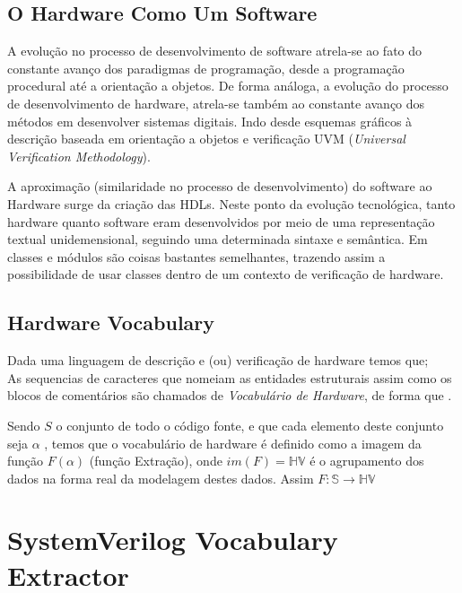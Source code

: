 \documentclass[12pt, twocolumn, a4paper]{article}
\begin{document}

	\subsection{O Hardware Como Um Software}
\quad A evolução no processo de desenvolvimento de software atrela-se ao fato do constante avanço dos paradigmas de programação, desde a programação procedural até a orientação a objetos. De forma análoga, a evolução do processo de desenvolvimento de hardware, atrela-se também ao constante avanço dos métodos em desenvolver sistemas digitais. Indo desde esquemas gráficos à descrição baseada em orientação a objetos e verificação UVM (\textit{Universal Verification Methodology}).

A aproximação (similaridade no processo de desenvolvimento) do software ao Hardware surge da criação das HDLs. Neste ponto da evolução tecnológica, tanto hardware quanto software eram desenvolvidos por meio de uma representação textual unidemensional, seguindo uma determinada sintaxe e semântica. Em \cite{Hahanov2008} classes e módulos são coisas bastantes semelhantes, trazendo assim a possibilidade de usar classes dentro de um contexto de verificação de hardware. 

	\subsection{Hardware Vocabulary} 
	
Dada uma linguagem de descrição e (ou) verificação de hardware temos que;\\
As sequencias de caracteres que nomeiam as entidades estruturais assim como os blocos de comentários são chamados de \textit{Vocabulário de Hardware}, de forma que .  

Sendo $S$ o conjunto de todo o código fonte, e que cada elemento deste conjunto seja $\alpha$ , temos que o vocabulário de hardware é definido como  a imagem da função $F(\alpha)$ (função Extração), onde $im(F) = \mathbb{HV}$ é o agrupamento dos dados na forma real da modelagem destes dados. Assim $F: \mathbb{S}\rightarrow\mathbb{HV}$
	\section{SystemVerilog Vocabulary Extractor}
	
\end{document}
